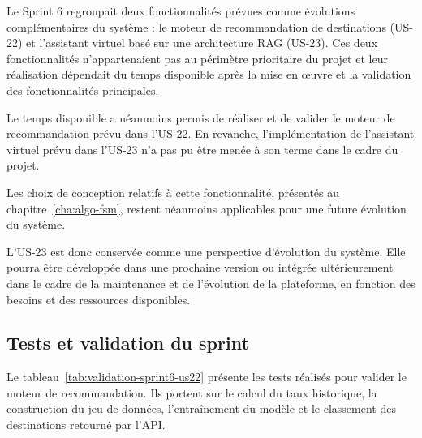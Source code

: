 Le Sprint 6 regroupait deux fonctionnalités prévues comme évolutions complémentaires du système : le moteur de recommandation de destinations (US-22) et l'assistant virtuel basé sur une architecture RAG (US-23). Ces deux fonctionnalités n'appartenaient pas au périmètre prioritaire du projet et leur réalisation dépendait du temps disponible après la mise en œuvre et la validation des fonctionnalités principales.

Le temps disponible a néanmoins permis de réaliser et de valider le moteur de recommandation prévu dans l'US-22. En revanche, l'implémentation de l'assistant virtuel prévu dans l'US-23 n'a pas pu être menée à son terme dans le cadre du projet.

Les choix de conception relatifs à cette fonctionnalité, présentés au chapitre~\ref{cha:algo-fsm}, restent néanmoins applicables pour une future évolution du système.  

L'US-23 est donc conservée comme une perspective d'évolution du système. Elle pourra être développée dans une prochaine version ou intégrée ultérieurement dans le cadre de la maintenance et de l'évolution de la plateforme, en fonction des besoins et des ressources disponibles.


\subsection{Tests et validation du sprint}

Le tableau~\ref{tab:validation-sprint6-us22} présente les tests réalisés pour
valider le moteur de recommandation. Ils portent sur le calcul du taux
historique, la construction du jeu de données, l'entraînement du modèle et le
classement des destinations retourné par l'API.

\renewcommand{\arraystretch}{1.3}

